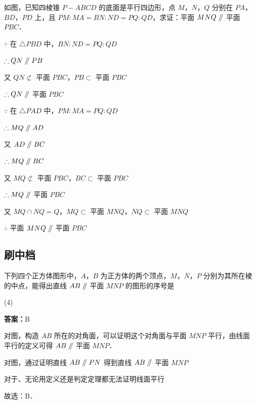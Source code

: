 \vspace{2em}

\begin{example}[\bkstar{2}{5}]
如图，已知四棱锥 $P-ABCD$ 的底面是平行四边形，点 $M$，$N$，$Q$ 分别在 $PA$，$BD$，$PD$ 上，且 $PM:MA=BN:ND=PQ:QD$，求证：平面 $MNQ\mathrel{/\mkern-5mu/}$ 平面 $PBC$．
\end{example}
\begin{solution}
$\because$ 在 $\triangle PBD$ 中，$BN:ND=PQ:QD$

$\therefore QN\mathrel{/\mkern-5mu/} PB$

又 $QN\not\subset$ 平面 $PBC$，$PB\subset$ 平面 $PBC$

$\therefore QN\mathrel{/\mkern-5mu/}$ 平面 $PBC$

$\because$ 在 $\triangle PAD$ 中，$PM:MA=PQ:QD$

$\therefore MQ\mathrel{/\mkern-5mu/} AD$

又 $AD\mathrel{/\mkern-5mu/} BC$

$\therefore MQ\mathrel{/\mkern-5mu/} BC$

又 $MQ\not\subset$ 平面 $PBC$，$BC\subset$ 平面 $PBC$

$\therefore MQ\mathrel{/\mkern-5mu/}$ 平面 $PBC$

又 $MQ\cap NQ=Q$，$MQ\subset$ 平面 $MNQ$，$NQ\subset$ 平面 $MNQ$

$\therefore$ 平面 $MNQ\mathrel{/\mkern-5mu/}$ 平面 $PBC$
\end{solution}

\vspace{2em}

\subsection{刷中档}

\begin{example}[\bkstar{2}{5}]
下列四个正方体图形中，$A$，$B$ 为正方体的两个顶点，$M$，$N$，$P$ 分别为其所在棱的中点，能得出直线 $AB\mathrel{/\mkern-5mu/}$ 平面 $MNP$ 的图形的序号是
\begin{tasks}(4)
    \task {}
    \task {}
    \task {}
    \task {}
\end{tasks}
\end{example}
\begin{solution}
\textbf{答案：}B

对图，构造 $AB$ 所在的对角面，可以证明这个对角面与平面 $MNP$ 平行，由线面平行的定义可得 $AB\mathrel{/\mkern-5mu/}$ 平面 $MNP$．

对图，通过证明直线 $AB\mathrel{/\mkern-5mu/} PN$ 得到直线 $AB\mathrel{/\mkern-5mu/}$ 平面 $MNP$

对于、无论用定义还是判定定理都无法证明线面平行

故选：B．
\end{solution}

